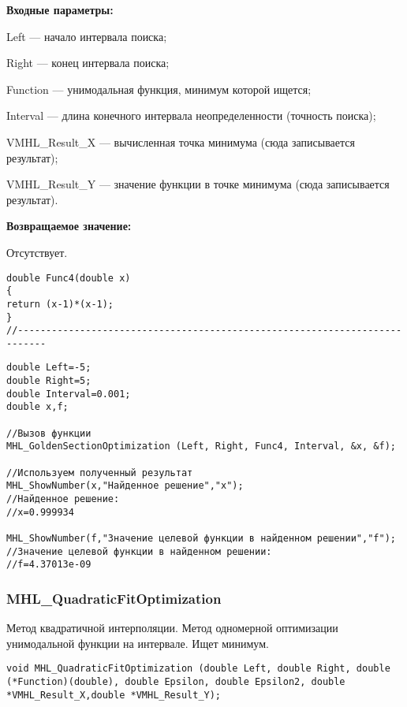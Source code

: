 \documentclass[a4paper,12pt]{article}
\begin{document}
\textbf{Входные параметры:}

 Left --- начало интервала поиска;
 
Right --- конец интервала поиска;
 
Function --- унимодальная функция, минимум которой ищется;
 
Interval --- длина конечного интервала неопределенности (точность поиска);
 
VMHL\_Result\_X --- вычисленная точка минимума (сюда записывается результат);
 
VMHL\_Result\_Y --- значение функции в точке минимума (сюда записывается результат).

\textbf{Возвращаемое значение:}
 
 Отсутствует.

\begin{lstlisting}[caption=Оптимизируемая функция]
double Func4(double x)
{
return (x-1)*(x-1);
}
//---------------------------------------------------------------------------
\end{lstlisting}


\begin{lstlisting}[label=code_use_MHL_GoldenSectionOptimization,caption=Пример использования]
double Left=-5;
double Right=5;
double Interval=0.001;
double x,f;

//Вызов функции
MHL_GoldenSectionOptimization (Left, Right, Func4, Interval, &x, &f);

//Используем полученный результат
MHL_ShowNumber(x,"Найденное решение","x");
//Найденное решение:
//x=0.999934

MHL_ShowNumber(f,"Значение целевой функции в найденном решении","f");
//Значение целевой функции в найденном решении:
//f=4.37013e-09
\end{lstlisting}

\subsubsection{MHL\_QuadraticFitOptimization}\label{MHL_QuadraticFitOptimization}

Метод квадратичной интерполяции. Метод одномерной оптимизации унимодальной функции на интервале. Ищет минимум.


\begin{lstlisting}[label=code_syntax_MHL_QuadraticFitOptimization,caption=Синтаксис]
void MHL_QuadraticFitOptimization (double Left, double Right, double (*Function)(double), double Epsilon, double Epsilon2, double *VMHL_Result_X,double *VMHL_Result_Y);
\end{lstlisting}
\end{document}
